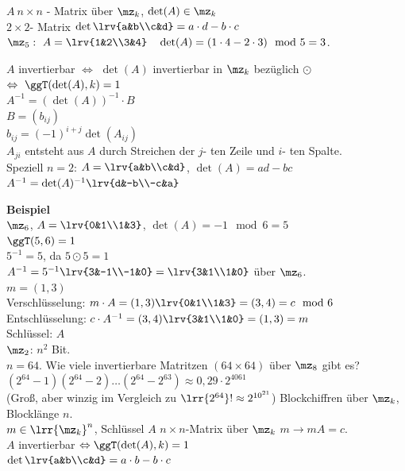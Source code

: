 		$A\ n\times n$ - Matrix über $\mz_k$, $\det(A)\in\mz_k$\\
		$2\times 2$- Matrix $\det\lrv{a&b\\c&d}=a\cdot d-b\cdot c$\\
		$\mz_5:\ A=\lrv{1&2\\3&4}\quad\det(A)=(1\cdot 4-2\cdot 3)\mod 5=3$.
		
		$A$ invertierbar $\Leftrightarrow$ $\det(A)$ invertierbar in $\mz_k$ bezüglich $\odot$ $\Leftrightarrow\ \ggT(\det(A),k)=1$\\
		$A^{-1}=(\det(A))^{-1}\cdot B$\\
		$B=(b_{ij})$\\
		$b_{ij}=(-1)^{i+j}\det(A_{ij})$\\
		$A_{ji}$ entsteht aus $A$ durch Streichen der $j$- ten Zeile und $i$- ten Spalte.\\
		Speziell $n=2$: $A=\lrv{a&b\\c&d}$, $\det(A)=ad-bc$\\
		$A^{-1}=\det(A)^{-1}\lrv{d&-b\\-c&a}$
		
		\textbf{Beispiel}\\
		$\mz_6$, $A=\lrv{0&1\\1&3}$, $\det(A)=-1\mod 6=5$\\
		$\ggT(5,6)=1$\\
		$5^{-1}=5$, da $5\odot 5=1$\\
		$A^{-1}=5^{-1}\lrv{3&-1\\-1&0}=\lrv{3&1\\1&0}$ über $\mz_6$.\\
		$m=(1,3)$\\
		Verschlüsselung: $m\cdot A=(1,3)\lrv{0&1\\1&3}=(3,4)=c\mod 6$\\
		Entschlüsselung: $c\cdot A^{-1}=(3,4)\lrv{3&1\\1&0}=(1, 3)=m$\\
		Schlüssel: $A$\\
		$\mz_2$: $n^2$ Bit.\\
		$n=64$. Wie viele invertierbare Matritzen $(64\times 64)$ über $\mz_8$ gibt es?\\
		$(2^{64}-1)(2^{64}-2)\dots(2^{64}-2^{63})\approx 0,29\cdot 2^{4061}$\\
		(Groß, aber winzig im Vergleich zu $\lrr{2^{64}}!\approx 2^{10^{21}}$)
\newpage	
		Blockchiffren über $\mz_k$, Blocklänge $n$.\\
		$m\in\lrr{\mz_k}^n$, Schlüssel $A$ $n\times n$-Matrix über $\mz_k$ $m\rightarrow mA=c$.\\
		$A$ invertierbar $\Leftrightarrow \ggT(\det(A), k)=1$\\
		$\det\lrv{a&b\\c&d}=a\cdot b-b\cdot c$
		
